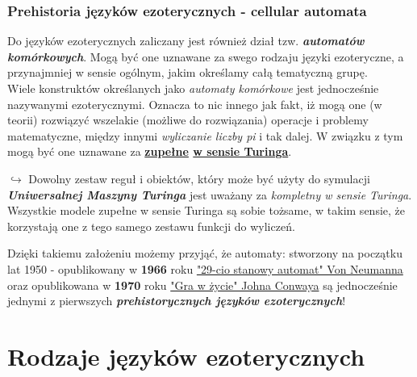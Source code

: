 \documentclass[fleqn,10pt]{SelfArx} %
\begin{document}
\subsubsection{Prehistoria języków ezoterycznych - cellular automata}
Do języków ezoterycznych zaliczany jest również dział tzw. \textbf{\textit{automatów komórkowych}}.
Mogą być one uznawane za swego rodzaju języki ezoteryczne, a przynajmniej w sensie ogólnym, jakim określamy całą tematyczną grupę.\\
Wiele konstruktów określanych jako \textit{automaty komórkowe} jest jednocześnie nazywanymi ezoterycznymi.
Oznacza to nic innego jak fakt, iż mogą one (w teorii) rozwiązyć wszelakie (możliwe do rozwiązania) 
operacje i problemy matematyczne, między innymi \textit{wyliczanie liczby pi} i tak dalej. 
W związku z tym mogą być one uznawane za \textbf{\underline{zupełne} \underline{w sensie Turinga}}.
\begin{adjustwidth}{1cm}{0cm} 
	$\hookrightarrow$ Dowolny zestaw reguł i obiektów, który może być użyty do symulacji \textbf{\textit{Uniwersalnej Maszyny Turinga}}
	jest uważany za \textit{kompletny w sensie Turinga}. Wszystkie modele zupełne w sensie Turinga są sobie tożsame, 
	w takim sensie, że korzystają one z tego samego zestawu funkcji do wyliczeń.\cite{IEEEXplore:TuringCompletnessCivilization}
\end{adjustwidth}
Dzięki takiemu założeniu możemy przyjąć, że automaty: stworzony na początku lat 1950 - opublikowany w \textbf{1966} roku \underline{"29-cio stanowy automat" Von Neumanna}
oraz opublikowana w \textbf{1970} roku \underline{"Gra w życie" Johna Conwaya} są jednocześnie jednymi z pierwszych \textbf{\textit{prehistorycznych języków ezoterycznych}}!



\section{Rodzaje języków ezoterycznych \cite{esolangWiki:esolangs}}	%
\end{document}
